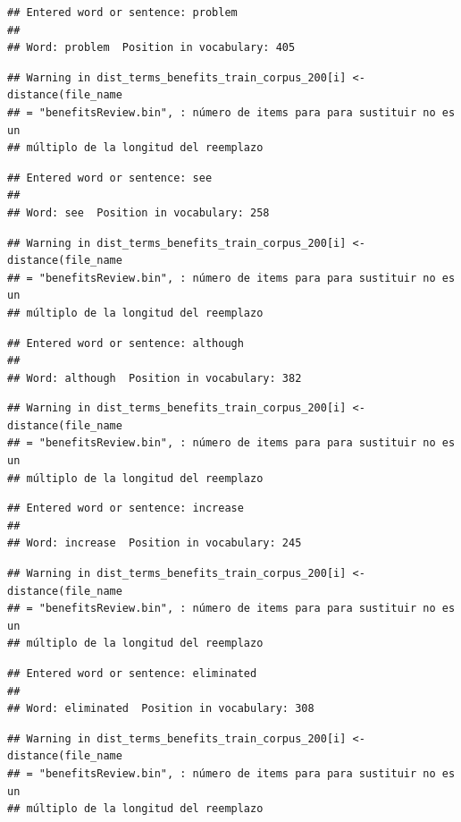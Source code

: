 \documentclass[spanish,]{article}
\begin{document}
\begin{verbatim}
## Entered word or sentence: problem
## 
## Word: problem  Position in vocabulary: 405
\end{verbatim}

\begin{verbatim}
## Warning in dist_terms_benefits_train_corpus_200[i] <- distance(file_name
## = "benefitsReview.bin", : número de items para para sustituir no es un
## múltiplo de la longitud del reemplazo
\end{verbatim}

\begin{verbatim}
## Entered word or sentence: see
## 
## Word: see  Position in vocabulary: 258
\end{verbatim}

\begin{verbatim}
## Warning in dist_terms_benefits_train_corpus_200[i] <- distance(file_name
## = "benefitsReview.bin", : número de items para para sustituir no es un
## múltiplo de la longitud del reemplazo
\end{verbatim}

\begin{verbatim}
## Entered word or sentence: although
## 
## Word: although  Position in vocabulary: 382
\end{verbatim}

\begin{verbatim}
## Warning in dist_terms_benefits_train_corpus_200[i] <- distance(file_name
## = "benefitsReview.bin", : número de items para para sustituir no es un
## múltiplo de la longitud del reemplazo
\end{verbatim}

\begin{verbatim}
## Entered word or sentence: increase
## 
## Word: increase  Position in vocabulary: 245
\end{verbatim}

\begin{verbatim}
## Warning in dist_terms_benefits_train_corpus_200[i] <- distance(file_name
## = "benefitsReview.bin", : número de items para para sustituir no es un
## múltiplo de la longitud del reemplazo
\end{verbatim}

\begin{verbatim}
## Entered word or sentence: eliminated
## 
## Word: eliminated  Position in vocabulary: 308
\end{verbatim}

\begin{verbatim}
## Warning in dist_terms_benefits_train_corpus_200[i] <- distance(file_name
## = "benefitsReview.bin", : número de items para para sustituir no es un
## múltiplo de la longitud del reemplazo
\end{verbatim}
\end{document}
